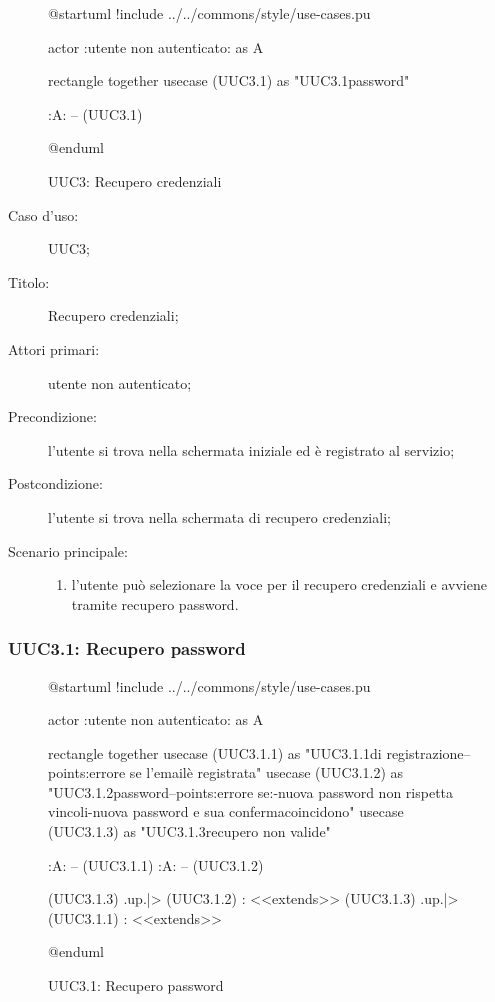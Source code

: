 \documentclass[../../../analisi-dei-requisiti.tex]{subfiles}
\begin{document}
\begin{figure}[H]
  \centering
  \begin{plantuml}
  @startuml
  !include ../../commons/style/use-cases.pu

  actor :utente non autenticato: as A

  rectangle {
    together {
      usecase (UUC3.1) as "UUC3.1\nRecupero password"
    }
  }

  :A: -- (UUC3.1)

  @enduml
  \end{plantuml}
  \caption{UUC3: Recupero credenziali}%
  \label{fig:uuc3}
\end{figure}

\begin{description}
  \item[Caso d’uso:] UUC3;
  \item[Titolo:] Recupero credenziali;
  \item[Attori primari:] utente non autenticato;
  \item[Precondizione:] l'utente si trova nella schermata iniziale ed è registrato al servizio;
  \item[Postcondizione:] l'utente si trova nella schermata di recupero credenziali;
  \item[Scenario principale:]
        \begin{enumerate}
          \item l'utente può selezionare la voce per il recupero credenziali e avviene tramite recupero password.
        \end{enumerate}
\end{description}

\subsubsection{UUC3.1: Recupero password}%
\label{subs:UUC3.1}

\begin{figure}[H]
  \centering
  \begin{plantuml}
  @startuml
  !include ../../commons/style/use-cases.pu

  actor :utente non autenticato: as A

  rectangle {
    together {
      usecase (UUC3.1.1) as "UUC3.1.1\nInserimento\nemail di registrazione\n--\nExtension points:\nVisualizzazione errore se l'email\nnon è registrata"
      usecase (UUC3.1.2) as "UUC3.1.2\nReimpostazione password\n--\nExtension points:\nVisualizzazione errore se:\n-nuova password non rispetta vincoli\n-nuova password e sua conferma\nnon coincidono"
      usecase (UUC3.1.3) as "UUC3.1.3\nInformazioni recupero non valide"
    }
  }

  :A: -- (UUC3.1.1)
  :A: -- (UUC3.1.2)

  (UUC3.1.3) .up.|> (UUC3.1.2) : <<extends>>
  (UUC3.1.3) .up.|> (UUC3.1.1) : <<extends>>

  @enduml
  \end{plantuml}
  \caption{UUC3.1: Recupero password}%
  \label{fig:uuc3_1}
\end{figure}
\end{document}
